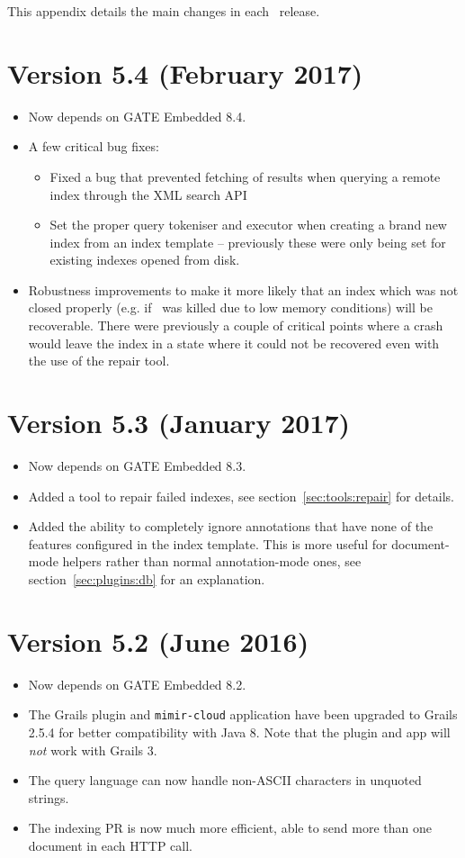 This appendix details the main changes in each \Mimir\ release.

\section{Version 5.4 (February 2017)}
\begin{itemize}
\item Now depends on GATE Embedded 8.4.
\item A few critical bug fixes:
  \begin{itemize}
  \item Fixed a bug that prevented fetching of results when querying a remote
    index through the XML search API
  \item Set the proper query tokeniser and executor when creating a brand new
    index from an index template -- previously these were only being set for
    existing indexes opened from disk.
  \end{itemize}
\item Robustness improvements to make it more likely that an index which was
  not closed properly (e.g. if \Mimir\ was killed due to low memory conditions)
  will be recoverable.  There were previously a couple of critical points where
  a crash would leave the index in a state where it could not be recovered even
  with the use of the repair tool.
\end{itemize}

\section{Version 5.3 (January 2017)}
\begin{itemize}
\item Now depends on GATE Embedded 8.3.
\item Added a tool to repair failed indexes, see section~\ref{sec:tools:repair}
  for details.
\item Added the ability to completely ignore annotations that have none of the
  features configured in the index template.  This is more useful for
  document-mode helpers rather than normal annotation-mode ones, see
  section~\ref{sec:plugins:db} for an explanation.
\end{itemize}

\section{Version 5.2 (June 2016)}
\begin{itemize}
\item Now depends on GATE Embedded 8.2.
\item The Grails plugin and \verb!mimir-cloud! application have been upgraded
  to Grails 2.5.4 for better compatibility with Java 8.  Note that the plugin
  and app will \emph{not} work with Grails 3.
\item The query language can now handle non-ASCII characters in unquoted
  strings.
\item The \Mimir{} indexing PR is now much more efficient, able to send more
  than one document in each HTTP call.
\end{itemize}

